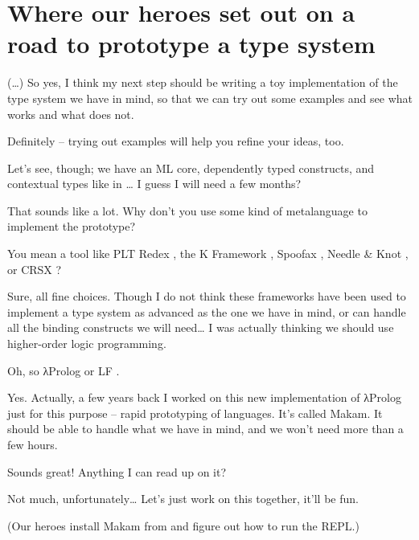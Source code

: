 \section{Where our heroes set out on a road to prototype a type
system}\label{where-our-heroes-set-out-on-a-road-to-prototype-a-type-system}

 (\ldots{}) So yes, I think my next step should be
writing a toy implementation of the type system we have in mind, so that
we can try out some examples and see what works and what does not.

 Definitely -- trying out examples will help you
refine your ideas, too.

\heroSTUDENT{} Let's see, though; we have an ML core, dependently typed
constructs, and contextual types like in
\citet{nanevski2008contextual}\ldots{} I guess I will need a few months?

\heroADVISOR{} That sounds like a lot. Why don't you use some kind of
metalanguage to implement the prototype?

\heroSTUDENT{} You mean a tool like PLT Redex \citep{felleisen2009semantics},
the K Framework \citep{rosu2010overview,ellison2009rewriting}, Spoofax
\citep{kats2010spoofax}, Needle \& Knot \citep{keuchel2016needle}, or
CRSX \citep{rose2011crsx}?

\heroADVISOR{} Sure, all fine choices. Though I do not think these frameworks
have been used to implement a type system as advanced as the one we have
in mind, or can handle all the binding constructs we will need\ldots{} I
was actually thinking we should use higher-order logic programming.

\heroSTUDENT{} Oh, so \foreignlanguage{greek}{λ}Prolog \citep{miller1988overview} or LF
\citep{pfenning1999system}.

\heroADVISOR{} Yes. Actually, a few years back I worked on this new
implementation of \foreignlanguage{greek}{λ}Prolog just for this purpose -- rapid prototyping of
languages. It's called Makam. It should be able to handle what we have
in mind, and we won't need more than a few hours.

\heroSTUDENT{} Sounds great! Anything I can read up on it?

\heroADVISOR{} Not much, unfortunately\ldots{} Let's just work on this
together, it'll be fun.

\begin{scenecomment}
(Our heroes install Makam from
\fi\xspace
and figure out how to run the REPL.)
\end{scenecomment}
